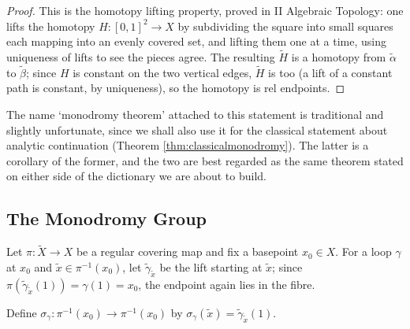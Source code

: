 \documentclass[a4paper]{scrartcl}
\begin{document}
\begin{proof}
	This is the homotopy lifting property, proved in II Algebraic Topology: one lifts the
	homotopy $H : [0,1]^2 \to X$ by subdividing the square into small squares each mapping
	into an evenly covered set, and lifting them one at a time, using uniqueness of lifts to
	see the pieces agree. The resulting $\tilde H$ is a homotopy from $\tilde\alpha$ to
	$\tilde\beta$; since $H$ is constant on the two vertical edges, $\tilde H$ is too (a
	lift of a constant path is constant, by uniqueness), so the homotopy is rel endpoints.
\end{proof}

The name `monodromy theorem' attached to this statement is traditional and slightly
unfortunate, since we shall also use it for the classical statement about analytic
continuation (Theorem \ref{thm:classicalmonodromy}). The latter is a corollary of the
former, and the two are best regarded as the same theorem stated on either side of the
dictionary we are about to build.

\subsection{The Monodromy Group}

Let $\pi : \tilde X \to X$ be a regular covering map and fix a basepoint $x_0 \in X$. For
a loop $\gamma$ at $x_0$ and $\tilde x \in \pi^{-1}(x_0)$, let $\tilde\gamma_{\tilde x}$
be the lift starting at $\tilde x$; since $\pi(\tilde\gamma_{\tilde x}(1)) = \gamma(1) = x_0$,
the endpoint again lies in the fibre.

\begin{definition}
	Define $\sigma_\gamma : \pi^{-1}(x_0) \to \pi^{-1}(x_0)$ by
	$\sigma_\gamma(\tilde x) = \tilde\gamma_{\tilde x}(1)$.
\end{definition}
\end{document}
